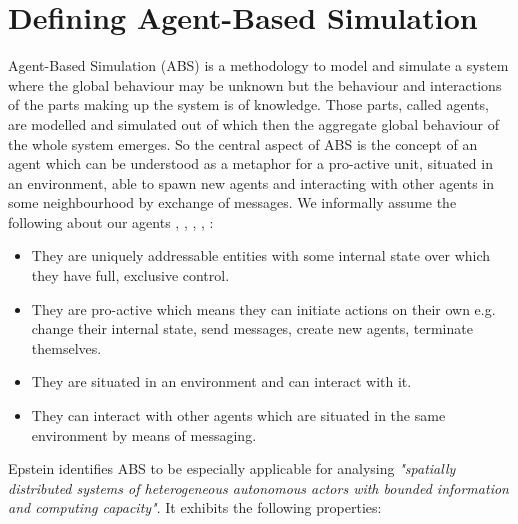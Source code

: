 \section{Defining Agent-Based Simulation}
\label{sec:defining_abs}

Agent-Based Simulation (ABS) is a methodology to model and simulate a system where the global behaviour may be unknown but the behaviour and interactions of the parts making up the system is of knowledge. Those parts, called agents, are modelled and simulated out of which then the aggregate global behaviour of the whole system emerges. So the central aspect of ABS is the concept of an agent which can be understood as a metaphor for a pro-active unit, situated in an environment, able to spawn new agents and interacting with other agents in some neighbourhood by exchange of messages. 
We informally assume the following about our agents \cite{siebers_introduction_2008}, \cite{wooldridge_introduction_2009}, \cite{siebers_discrete-event_2010}, \cite{dawson_opening_2014}, \cite{macal_everything_2016}:

\begin{itemize}
	\item They are uniquely addressable entities with some internal state over which they have full, exclusive control.
	\item They are pro-active which means they can initiate actions on their own e.g. change their internal state, send messages, create new agents, terminate themselves.
	\item They are situated in an environment and can interact with it.
	\item They can interact with other agents which are situated in the same environment by means of messaging.
\end{itemize} 

Epstein \cite{epstein_generative_2012} identifies ABS to be especially applicable for analysing \textit{"spatially distributed systems of heterogeneous autonomous actors with bounded information and computing capacity"}. %
It exhibits the following properties:

